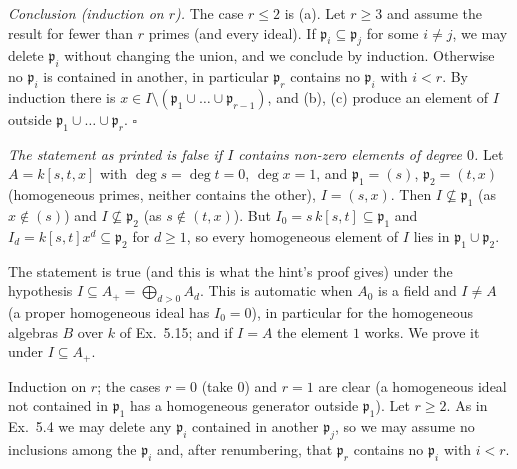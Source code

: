 \documentclass[11pt]{article}
\begin{document}
\emph{Conclusion (induction on $r$).} The case $r\le2$ is (a). Let $r\ge3$ and assume the result for fewer than $r$ primes (and every ideal). If $\mathfrak p_i\subseteq\mathfrak p_j$ for some $i\ne j$, we may delete $\mathfrak p_i$ without changing the union, and we conclude by induction. Otherwise no $\mathfrak p_i$ is contained in another, in particular $\mathfrak p_r$ contains no $\mathfrak p_i$ with $i<r$. By induction there is $x\in I\setminus(\mathfrak p_1\cup\dots\cup\mathfrak p_{r-1})$, and (b), (c) produce an element of $I$ outside $\mathfrak p_1\cup\dots\cup\mathfrak p_r$. \hfill$\square$

\pf
\emph{The statement as printed is false if $I$ contains non-zero elements of degree $0$.} Let $A=k[s,t,x]$ with $\deg s=\deg t=0$, $\deg x=1$, and $\mathfrak p_1=(s)$, $\mathfrak p_2=(t,x)$ (homogeneous primes, neither contains the other), $I=(s,x)$. Then $I\not\subseteq\mathfrak p_1$ (as $x\notin(s)$) and $I\not\subseteq\mathfrak p_2$ (as $s\notin(t,x)$). But $I_0=s\,k[s,t]\subseteq\mathfrak p_1$ and $I_d=k[s,t]x^d\subseteq\mathfrak p_2$ for $d\ge1$, so every homogeneous element of $I$ lies in $\mathfrak p_1\cup\mathfrak p_2$.

The statement is true (and this is what the hint's proof gives) under the hypothesis $I\subseteq A_+=\bigoplus_{d>0}A_d$. This is automatic when $A_0$ is a field and $I\ne A$ (a proper homogeneous ideal has $I_0=0$), in particular for the homogeneous algebras $B$ over $k$ of Ex.~5.15; and if $I=A$ the element $1$ works. We prove it under $I\subseteq A_+$.

Induction on $r$; the cases $r=0$ (take $0$) and $r=1$ are clear (a homogeneous ideal not contained in $\mathfrak p_1$ has a homogeneous generator outside $\mathfrak p_1$). Let $r\ge2$. As in Ex.~5.4 we may delete any $\mathfrak p_i$ contained in another $\mathfrak p_j$, so we may assume no inclusions among the $\mathfrak p_i$ and, after renumbering, that $\mathfrak p_r$ contains no $\mathfrak p_i$ with $i<r$.
\end{document}
